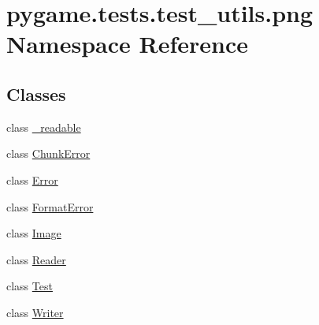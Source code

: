 \hypertarget{namespacepygame_1_1tests_1_1test__utils_1_1png}{}\section{pygame.\+tests.\+test\+\_\+utils.\+png Namespace Reference}
\label{namespacepygame_1_1tests_1_1test__utils_1_1png}
\subsection*{Classes}
\begin{DoxyCompactItemize}
\item 
class \hyperlink{classpygame_1_1tests_1_1test__utils_1_1png_1_1__readable}{\+\_\+readable}
\item 
class \hyperlink{classpygame_1_1tests_1_1test__utils_1_1png_1_1_chunk_error}{Chunk\+Error}
\item 
class \hyperlink{classpygame_1_1tests_1_1test__utils_1_1png_1_1_error}{Error}
\item 
class \hyperlink{classpygame_1_1tests_1_1test__utils_1_1png_1_1_format_error}{Format\+Error}
\item 
class \hyperlink{classpygame_1_1tests_1_1test__utils_1_1png_1_1_image}{Image}
\item 
class \hyperlink{classpygame_1_1tests_1_1test__utils_1_1png_1_1_reader}{Reader}
\item 
class \hyperlink{classpygame_1_1tests_1_1test__utils_1_1png_1_1_test}{Test}
\item 
class \hyperlink{classpygame_1_1tests_1_1test__utils_1_1png_1_1_writer}{Writer}
\end{DoxyCompactItemize}
